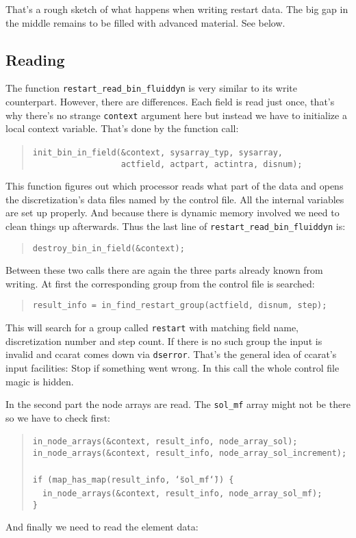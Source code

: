 That's a rough sketch of what happens when writing restart data. The
big gap in the middle remains to be filled with advanced material.
See below.


\subsection{Reading}

The function \texttt{restart{\_}read{\_}bin{\_}fluiddyn} is
very similar to its write counterpart. However, there are differences.
Each field is read just once, that's why there's no strange \texttt{context}
argument here but instead we have to initialize a local context variable.
That's done by the function call: 

\begin{quote}
\texttt{init{\_}bin{\_}in{\_}field({\&}context,~sysarray{\_}typ,~sysarray,~}~\\
 \texttt{~~~~~~~~~~~~~~~~~~actfield,~actpart,~actintra,~disnum); }
\end{quote}
This function figures out which processor reads what part of the data
and opens the discretization's data files named by the control file.
All the internal variables are set up properly. And because there
is dynamic memory involved we need to clean things up afterwards.
Thus the last line of \texttt{restart{\_}read{\_}bin{\_}fluiddyn}
is: 

\begin{quote}
\texttt{destroy{\_}bin{\_}in{\_}field({\&}context); }
\end{quote}
Between these two calls there are again the three parts already known
from writing. At first the corresponding group from the control file
is searched: 

\begin{quote}
\texttt{result{\_}info~=~in{\_}find{\_}restart{\_}group(actfield,~disnum,~step); }
\end{quote}
This will search for a group called \texttt{restart} with matching
field name, discretization number and step count. If there is no such
group the input is invalid and ccarat comes down via \texttt{dserror}.
That's the general idea of ccarat's input facilities: Stop if something
went wrong. In this call the whole control file magic is hidden.

In the second part the node arrays are read. The \texttt{sol{\_}mf}
array might not be there so we have to check first: 

\begin{quote}
\texttt{in{\_}node{\_}arrays({\&}context,~result{\_}info,~node{\_}array{\_}sol);~}~\\
 \texttt{in{\_}node{\_}arrays({\&}context,~result{\_}info,~node{\_}array{\_}sol{\_}increment);~}~\\
 \texttt{if~(map{\_}has{\_}map(result{\_}info,~\char`\"{}sol{\_}mf\char`\"{}))~{\{}~}~\\
 \texttt{~~in{\_}node{\_}arrays({\&}context,~result{\_}info,~node{\_}array{\_}sol{\_}mf);~}~\\
 \texttt{{\}} }
\end{quote}
And finally we need to read the element data: 

